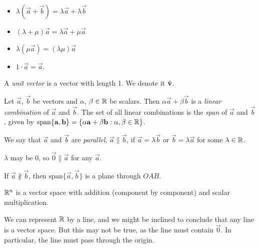 \documentclass{../../template/note}
\begin{document}
\begin{definition}
\begin{enumerate}[label=\protect\circled{\arabic*}]
            \begin{itemize}
                \item \(\lambda(\vec a + \vec b) = \lambda \vec a + \lambda \vec b\)
                \item \((\lambda + \mu)\vec a = \lambda \vec a + \mu \vec a\)
                \item \(\lambda(\mu \vec a) = (\lambda \mu)\vec a\)
                \item \(1 \cdot \vec a = \vec a\).
            \end{itemize}
            
            
            
            
            
        \end{enumerate}
    \end{definition}
    
    \begin{definition}
        A \emph{unit vector} is a vector with length 1. We denote it \(\hvec v\).
    \end{definition}
    
    \begin{definition}
        Let \(\vec a\), \(\vec b\) be vectors and \(\alpha\), \(\beta \in \mathbb R\) be scalars. Then \(\alpha \vec a + \beta \vec b\) is a \emph{linear combination} of \(\vec a\) and \(\vec b\). The set of all linear combinations is the \emph{span} of \(\vec a\) and \(\vec b\), given by \(\mathrm{span}\{\vec a, \vec b\} = \{\alpha \vec a + \beta \vec b: \alpha, \beta \in \RR\}\).
    \end{definition}
    
    \begin{definition}
        We say that \(\vec a\) and \(\vec b\) are \emph{parallel}, \(\vec a \parallel \vec b\), if \(\vec a = \lambda \vec b\) or \(\vec b = \lambda \vec a\) for some \(\lambda \in \mathbb R\).
    \end{definition}
    
    \begin{remark}
        \(\lambda\) may be 0, so \(\vec 0 \parallel \vec a\) for any \(\vec a\).
    \end{remark}
    
    If \(\vec a \nparallel \vec b\), then \(\mathrm{span}\{\vec a, \vec b\}\) is a plane through \(OAB\).

    \begin{example}
        \(\mathbb R^n\) is a vector space with addition (component by component) and scalar multiplication.

        We can represent \(\mathbb R\) by a line, and we might be inclined to conclude that any line is a vector space. But this may not be true, as the line must contain \(\vec 0\). In particular, the line must pass through the origin.
    \end{example}
    
\end{document}
